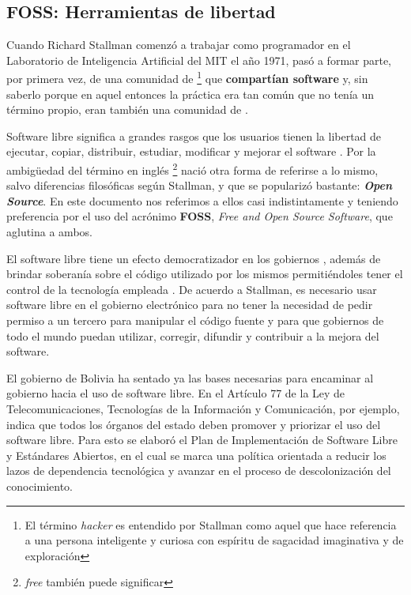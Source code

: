 \subsection{FOSS: Herramientas de libertad}

Cuando Richard Stallman comenzó a trabajar como programador en el Laboratorio de Inteligencia Artificial del MIT el año 1971,
pasó a formar parte, por primera vez, de una comunidad de
\footnote{El término \textit{hacker} es entendido por Stallman como aquel que hace referencia a una persona inteligente y curiosa con espíritu de sagacidad imaginativa y de exploración}
que \textbf{compartían software} y, sin saberlo porque en aquel entonces la práctica era tan común que no tenía un término propio, eran también una comunidad de  \cite{stallmanSoftwareLibrePara}.

Software libre significa a grandes rasgos que los usuarios tienen la libertad de ejecutar, copiar, distribuir, estudiar, modificar y mejorar el software \cite{QueEsSoftware}.
Por la ambigüedad del término en inglés
\footnote{\textit{free} también puede significar }
nació otra forma de referirse a lo mismo, salvo diferencias filosóficas según Stallman\cite{WhyOpenSource}, y que se popularizó bastante: \textbf{\textit{Open Source}}.
En este documento nos referimos a ellos casi indistintamente y teniendo preferencia por el uso del acrónimo \textbf{FOSS}, \textit{Free and Open Source Software}, que aglutina a ambos.

El software libre tiene un efecto democratizador en los gobiernos \cite{donorfioPoliticsFreeOpen2004},
además de brindar soberanía sobre el código utilizado por los mismos permitiéndoles tener el control de la tecnología empleada \cite{LibertadSoftwareSu}.
De acuerdo a Stallman, es necesario usar software libre en el gobierno electrónico para no tener la necesidad de pedir permiso a un tercero para manipular el código fuente y para que gobiernos de todo el mundo puedan utilizar, corregir, difundir y contribuir a la mejora del software\cite{SoftwareLibreGobierno}.

El gobierno de Bolivia ha sentado ya las bases necesarias para encaminar al gobierno hacia el uso de software libre.
En el Artículo 77 de la Ley de Telecomunicaciones, Tecnologías de la Información y Comunicación, por ejemplo, indica que todos los órganos del estado deben promover y priorizar el uso del software libre\cite{Ley164Ley2011}.
Para esto se elaboró el Plan de Implementación de Software Libre y Estándares Abiertos, en el cual se marca una política orientada a reducir los lazos de dependencia tecnológica y avanzar en el proceso de descolonización del conocimiento\cite{PLANIMPLEMENTACIONSOFTWARE}.

